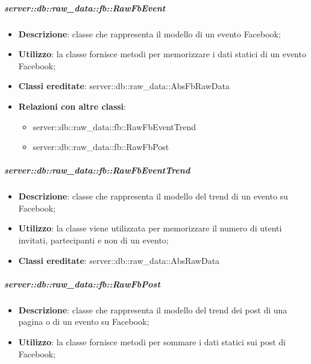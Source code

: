 			\subparagraph{server::db::raw\_data::fb::RawFbEvent} %
			\label{subp:server_db_raw_data_fb_rawfbevent}
				\begin{itemize}
					\item \textbf{Descrizione}: classe che rappresenta il modello di un evento Facebook;
					\item \textbf{Utilizzo}: la classe fornisce metodi per memorizzare i dati statici di un evento Facebook;
					\item \textbf{Classi ereditate}: server::db::raw\_data::AbsFbRawData
					\item \textbf{Relazioni con altre classi}:
						\begin{itemize}
							\item server::db::raw\_data::fb::RawFbEventTrend
							\item server::db::raw\_data::fb::RawFbPost
						\end{itemize}
				\end{itemize}


			\subparagraph{server::db::raw\_data::fb::RawFbEventTrend} %
			\label{subp:server_db_raw_data_fb_rowfbeventtrend}
				\begin{itemize}
					\item \textbf{Descrizione}: classe che rappresenta il modello del trend di un evento su Facebook;
					\item \textbf{Utilizzo}: la classe viene utilizzata per memorizzare il numero di utenti invitati, partecipanti e non di un evento;
					\item \textbf{Classi ereditate}: server::db::raw\_data::AbsRawData
				\end{itemize}


			\subparagraph{server::db::raw\_data::fb::RawFbPost} %
			\label{subp:server_db_raw_data_fb_rawfbpost}
				\begin{itemize}
					\item \textbf{Descrizione}: classe che rappresenta il modello del trend dei post di una pagina o di un evento su Facebook;
					\item \textbf{Utilizzo}: la classe fornisce metodi per sommare i dati statici sui post di Facebook;
				\end{itemize}


